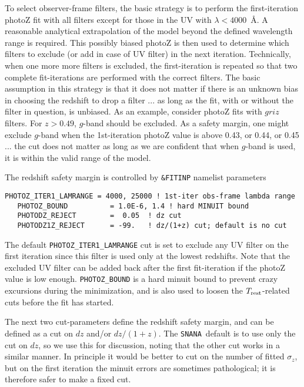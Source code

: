 \documentclass[12pt]{article}
\newcommand{\Trest}{T_{\rm rest}}
\newcommand{\snana}{{\tt SNANA}}
\begin{document}
To select observer-frame filters,
the basic strategy is to perform the first-iteration
photoZ fit with all filters except for those in 
the UV with $\lambda < 4000$~\AA.
A reasonable analytical extrapolation of the model beyond the 
defined wavelength range is required. This possibly biased 
photoZ is then used to determine which filters to exclude
(or add in case of UV filter) in the next iteration. 
Technically, when one more more filters is excluded, 
the first-iteration is repeated so that two complete 
fit-iterations are performed with the correct filters. 
The basic assumption in this strategy is that it does 
not matter if there is an unknown bias in choosing 
the redshift to drop a filter ... as long as the fit,
with or without the filter in question, is unbiased.
As an example, consider photoZ fits with $griz$ filters.
For $z>0.49$, $g$-band should be excluded. As a safety margin,
one might exclude $g$-band when the 1st-iteration photoZ value
is above 0.43, or 0.44, or 0.45 ... the cut does not matter as
long as we are confident that when $g$-band is used, 
it is within the valid range of the model.


The redshift safety margin is controlled by {\tt \&FITINP} namelist 
parameters 
%
\begin{Verbatim}[frame=single]
   PHOTOZ_ITER1_LAMRANGE = 4000, 25000 ! 1st-iter obs-frame lambda range
   PHOTOZ_BOUND          = 1.0E-6, 1.4 ! hard MINUIT bound
   PHOTODZ_REJECT        =  0.05  ! dz cut
   PHOTODZ1Z_REJECT      = -99.   ! dz/(1+z) cut; default is no cut
\end{Verbatim}
The default {\tt PHOTOZ\_ITER1\_LAMRANGE} cut is set to exclude
any UV filter on the first iteration since this filter is used
only at the lowest redshifts. Note that the excluded UV filter
can be added back after the first fit-iteration if the photoZ
value is low enough.  {\tt PHOTOZ\_BOUND} is a hard {\sc minuit}
bound to prevent crazy excursions during the minimization,
and is also used to loosen the $\Trest$-related cuts
before the fit has started.


The next two cut-parameters define the redshift safety margin,
and can be defined as a cut on $dz$  and/or  $dz/(1+z)$.
The \snana\ default is to use only the cut on $dz$,
so we use this for discussion, noting that the other
cut works in a similar manner.  In principle it would be
better to cut on the number of fitted $\sigma_z$,
but on the first iteration the {\sc minuit} errors
are sometimes pathological; it is therefore safer to make
a fixed cut.
\end{document}
